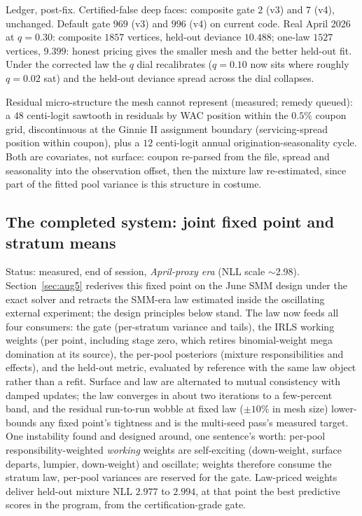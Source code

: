 \documentclass[11pt]{article}
\begin{document}
Ledger, post-fix. Certified-false deep faces: composite gate $2$ (v3)
and $7$ (v4), unchanged. Default gate $969$ (v3) and $996$ (v4)
on current code. Real April 2026 at $q=0.30$: composite $1857$
vertices, held-out deviance $10.488$; one-law $1527$ vertices,
$9.399$: honest pricing gives the smaller mesh and the better held-out
fit. Under the corrected law the $q$ dial recalibrates
($q=0.10$ now sits where roughly $q=0.02$ sat) and the held-out
deviance spread across the dial collapses.

Residual micro-structure the mesh cannot represent (measured; remedy
queued): a $48$ centi-logit sawtooth in residuals by WAC position
within the $0.5\%$ coupon grid, discontinuous at the Ginnie II
assignment boundary (servicing-spread position within coupon), plus a
$12$ centi-logit annual origination-seasonality cycle. Both are
covariates, not surface: coupon re-parsed from the file, spread and
seasonality into the observation offset, then the mixture law
re-estimated, since part of the fitted pool variance is this structure
in costume.


\subsection*{The completed system: joint fixed point and stratum means}

Status: measured, end of session, \emph{April-proxy era} (NLL scale
$\sim$2.98). Section~\ref{sec:aug5} rederives this fixed point on the June
SMM design under the exact solver and retracts the SMM-era law estimated
inside the oscillating external experiment; the design principles below
stand. The law now feeds all four consumers:
the gate (per-stratum variance and tails), the IRLS working weights
(per point, including stage zero, which retires binomial-weight mega
domination at its source), the per-pool posteriors (mixture
responsibilities and effects), and the held-out metric, evaluated by
reference with the same law object rather than a refit. Surface and law
are alternated to mutual consistency with damped updates; the law
converges in about two iterations to a few-percent band, and the
residual run-to-run wobble at fixed law ($\pm10\%$ in mesh size)
lower-bounds any fixed point's tightness and is the multi-seed pass's
measured target. One instability found and designed around, one
sentence's worth: per-pool responsibility-weighted \emph{working}
weights are self-exciting (down-weight, surface departs, lumpier,
down-weight) and oscillate; weights therefore consume the stratum law,
per-pool variances are reserved for the gate. Law-priced weights
deliver held-out mixture NLL $2.977$ to $2.994$, at that point the best
predictive scores in the program, from the certification-grade gate.
\end{document}
